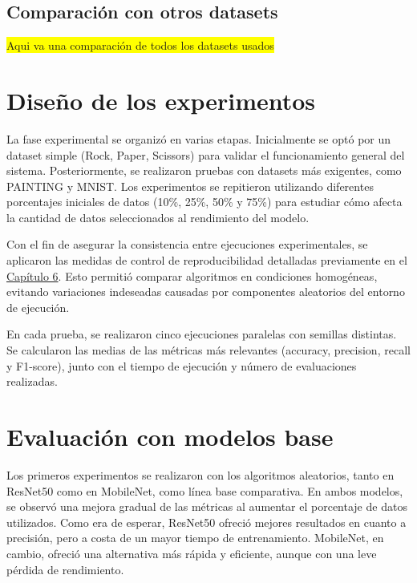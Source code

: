 \subsection{Comparación con otros datasets}\label{subsec:comparacion-con-otros-datasets}
\colorbox{yellow}{Aqui va una comparación de todos los datasets usados}


\section{Diseño de los experimentos}\label{sec:diseño-de-los-experimentos}
La fase experimental se organizó en varias etapas.
Inicialmente se optó por un dataset simple (Rock, Paper, Scissors) para validar el funcionamiento general del sistema.
Posteriormente, se realizaron pruebas con datasets más exigentes, como PAINTING y MNIST. Los experimentos se repitieron utilizando
diferentes porcentajes iniciales de datos (10\%, 25\%, 50\% y 75\%) para estudiar cómo afecta la cantidad de datos seleccionados al rendimiento del modelo.

Con el fin de asegurar la consistencia entre ejecuciones experimentales, se aplicaron las medidas de control de reproducibilidad detalladas previamente en el \hyperref[sec:consideraciones-de-optimizacion]{Capítulo 6}.
Esto permitió comparar algoritmos en condiciones homogéneas, evitando variaciones indeseadas causadas por componentes aleatorios del entorno de ejecución.

En cada prueba, se realizaron cinco ejecuciones paralelas con semillas distintas.
Se calcularon las medias de las métricas más relevantes (accuracy, precision, recall y F1-score), junto con el tiempo de ejecución y número
de evaluaciones realizadas.

\section{Evaluación con modelos base}\label{sec:evaluacion-con-modelos-base}
Los primeros experimentos se realizaron con los algoritmos aleatorios, tanto en ResNet50 como en MobileNet, como línea base comparativa.
En ambos modelos, se observó una mejora gradual de las métricas al aumentar el porcentaje de datos utilizados.
Como era de esperar, ResNet50 ofreció mejores resultados en cuanto a precisión, pero a costa de un mayor tiempo de entrenamiento.
MobileNet, en cambio, ofreció una alternativa más rápida y eficiente, aunque con una leve pérdida de rendimiento.

